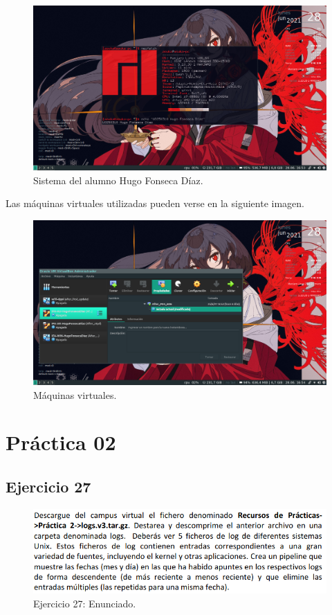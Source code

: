 \documentclass[11pt]{article}
\begin{document}
\begin{figure}[H]
  \caption{Sistema del alumno Hugo Fonseca Díaz.}
  \centering
    \includegraphics[scale=0.4, trim={0 1cm 0 0}, clip]{other/sistema_hugo.png}
\end{figure}

Las máquinas virtuales utilizadas pueden verse en la siguiente imagen.

\begin{figure}[H]
  \caption{Máquinas virtuales.}
  \centering
    \includegraphics[scale=0.4, trim={0 1cm 0 0}, clip]{other/maquinas_virtuales_hugo.png}
\end{figure}

\section{Práctica 02}

\subsection{Ejercicio 27}

\begin{figure}[H]
    \caption{Ejercicio 27: Enunciado.}
  \centering
  \includegraphics[scale=0.7]{other/enunciado_p02_e27.png}
\end{figure}
\end{document}
